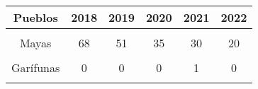 \begin{tabular}[t]{cccccc}
\toprule
\textbf{Pueblos} & \textbf{2018} & \textbf{2019} & \textbf{2020} & \textbf{2021} & \textbf{2022}\\
\midrule
\cellcolor[HTML]{B6B3FF}{Ladinas} & \cellcolor[HTML]{B6B3FF}{112} & \cellcolor[HTML]{B6B3FF}{123} & \cellcolor[HTML]{B6B3FF}{111} & \cellcolor[HTML]{B6B3FF}{105} & \cellcolor[HTML]{B6B3FF}{83}\\
Mayas & 68 & 51 & 35 & 30 & 20\\
\cellcolor[HTML]{B6B3FF}{Xincas} & \cellcolor[HTML]{B6B3FF}{0} & \cellcolor[HTML]{B6B3FF}{0} & \cellcolor[HTML]{B6B3FF}{0} & \cellcolor[HTML]{B6B3FF}{0} & \cellcolor[HTML]{B6B3FF}{0}\\
Garífunas & 0 & 0 & 0 & 1 & 0\\
\cellcolor[HTML]{B6B3FF}{Otros} & \cellcolor[HTML]{B6B3FF}{0} & \cellcolor[HTML]{B6B3FF}{0} & \cellcolor[HTML]{B6B3FF}{0} & \cellcolor[HTML]{B6B3FF}{0} & \cellcolor[HTML]{B6B3FF}{0}\\
\bottomrule
\end{tabular}
